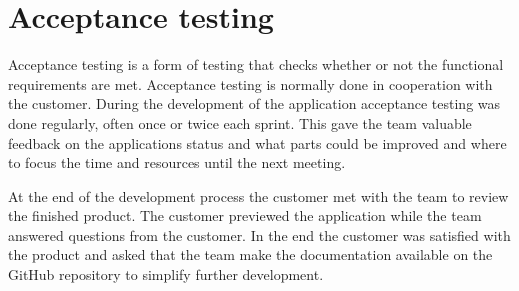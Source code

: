 \section{Acceptance testing}
Acceptance testing is a form of testing that checks whether or not the functional requirements are met. Acceptance testing is normally done in cooperation with the customer. During the development of the application acceptance testing was done regularly, often once or twice each sprint. This gave the team valuable feedback on the applications status and what parts could be improved and where to focus the time and resources until the next meeting.

At the end of the development process the customer met with the team to review the finished product. The customer previewed the application while the team answered questions from the customer. In the end the customer was satisfied with the product and asked that the team make the documentation available on the GitHub repository to simplify further development.
